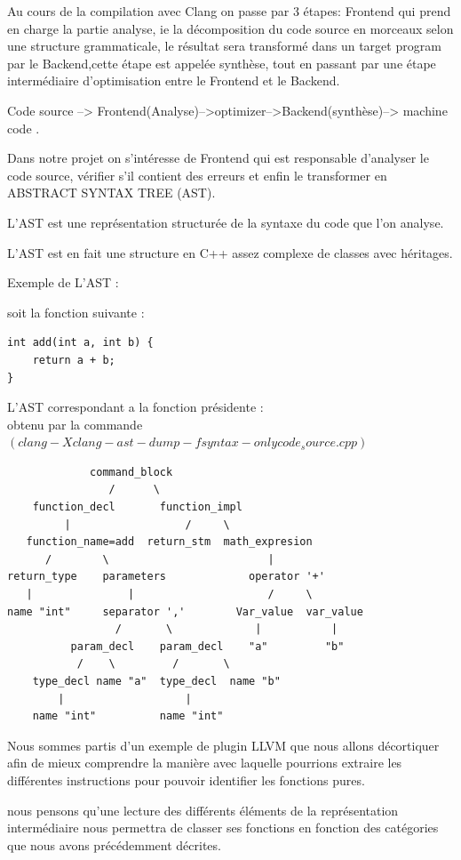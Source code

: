 \documentclass[12pt,titlepage]{article}
\begin{document}
Au cours de la compilation avec Clang on passe par 3 étapes: Frontend qui prend en charge la partie analyse, ie la décomposition du code source en morceaux selon une structure grammaticale, le résultat sera transformé  dans un target program par le Backend,cette étape est appelée synthèse, tout en passant par une étape intermédiaire d'optimisation entre le Frontend et le Backend.\cite{Devlieghere}

Code source --> Frontend(Analyse)-->optimizer-->Backend(synthèse)--> machine code .

Dans notre projet on s’intéresse de Frontend qui est responsable d'analyser le code source, vérifier s'il contient des erreurs et enfin le transformer en ABSTRACT SYNTAX TREE (AST).

L'AST est une représentation structurée de la syntaxe du code que l'on analyse. 

L'AST est en fait une structure en C++ assez complexe de classes avec héritages.

Exemple de L'AST :

soit la fonction  suivante :

\begin{lstlisting}
int add(int a, int b) {
    return a + b;
}
\end{lstlisting}

L'AST correspondant a la fonction présidente :\\
obtenu par la commande $(clang -Xclang -ast-dump -fsyntax-only code_source.cpp) $
\begin{lstlisting}
             command_block
                /      \
    function_decl       function_impl
         |                  /     \
   function_name=add  return_stm  math_expresion
      /        \                         |
return_type    parameters             operator '+'
   |               |                     /     \
name "int"     separator ','        Var_value  var_value
                 /       \             |           |
          param_decl    param_decl    "a"         "b"
           /    \         /       \
    type_decl name "a"  type_decl  name "b"
        |                   |
    name "int"          name "int"
\end{lstlisting}

Nous sommes partis d'un exemple de plugin LLVM que nous allons décortiquer afin de mieux comprendre la manière avec laquelle pourrions extraire les différentes instructions pour pouvoir identifier les fonctions pures.

nous pensons qu'une lecture des différents éléments de la représentation intermédiaire nous permettra de classer ses fonctions en fonction des catégories que nous avons précédemment décrites.
\end{document}
